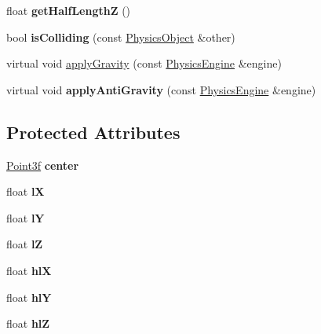 \begin{DoxyCompactItemize}
\item 
\hypertarget{class_physics_object_a15a8eacb2bb44101d82a90ff735e89d5}{float {\bfseries get\-Half\-Length\-Z} ()}\label{class_physics_object_a15a8eacb2bb44101d82a90ff735e89d5}

\item 
\hypertarget{class_physics_object_a851765b25b581e1ecab8b969d1bd42f0}{bool {\bfseries is\-Colliding} (const \hyperlink{class_physics_object}{Physics\-Object} \&other)}\label{class_physics_object_a851765b25b581e1ecab8b969d1bd42f0}

\item 
virtual void \hyperlink{class_physics_object_a7c1b644650bc303c43c872490e8c2b4e}{apply\-Gravity} (const \hyperlink{class_physics_engine}{Physics\-Engine} \&engine)
\item 
\hypertarget{class_physics_object_ae7b9430967f48709b64db2b4ab633164}{virtual void {\bfseries apply\-Anti\-Gravity} (const \hyperlink{class_physics_engine}{Physics\-Engine} \&engine)}\label{class_physics_object_ae7b9430967f48709b64db2b4ab633164}

\end{DoxyCompactItemize}
\subsection*{Protected Attributes}
\begin{DoxyCompactItemize}
\item 
\hypertarget{class_physics_object_ab0ce60cbb061db16da9e0fd868a51586}{\hyperlink{struct_point3f}{Point3f} {\bfseries center}}\label{class_physics_object_ab0ce60cbb061db16da9e0fd868a51586}

\item 
\hypertarget{class_physics_object_a9f9ef4229208ec5efbba6df67a02cee8}{float {\bfseries l\-X}}\label{class_physics_object_a9f9ef4229208ec5efbba6df67a02cee8}

\item 
\hypertarget{class_physics_object_ab425e7036aecd5c71e3404c25dda03c5}{float {\bfseries l\-Y}}\label{class_physics_object_ab425e7036aecd5c71e3404c25dda03c5}

\item 
\hypertarget{class_physics_object_a21fc35c7a916ca93c631fdfb321f7a58}{float {\bfseries l\-Z}}\label{class_physics_object_a21fc35c7a916ca93c631fdfb321f7a58}

\item 
\hypertarget{class_physics_object_afa34667751c71648d96d027fd3750a15}{float {\bfseries hl\-X}}\label{class_physics_object_afa34667751c71648d96d027fd3750a15}

\item 
\hypertarget{class_physics_object_a78f6bd33e51cf5af175a04db9099f60e}{float {\bfseries hl\-Y}}\label{class_physics_object_a78f6bd33e51cf5af175a04db9099f60e}

\item 
\hypertarget{class_physics_object_a792f1222d549a6a2971faf94a3afb1ff}{float {\bfseries hl\-Z}}\label{class_physics_object_a792f1222d549a6a2971faf94a3afb1ff}

\end{DoxyCompactItemize}


